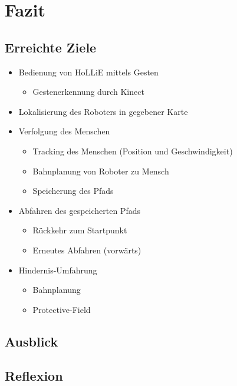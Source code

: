 
\chapter{Fazit}

\section{Erreichte Ziele}
\authorsection{\editordummy}

\begin{itemize}
  \item Bedienung von HoLLiE mittels Gesten
	\begin{itemize}
	\item Gestenerkennung durch Kinect
	\end{itemize}
  \item Lokalisierung des Roboters in gegebener Karte
  \item Verfolgung des Menschen
	\begin{itemize}
	  \item Tracking des Menschen (Position und Geschwindigkeit)
	  \item Bahnplanung von Roboter zu Mensch
	  \item Speicherung des Pfads
	\end{itemize}
  \item Abfahren des gespeicherten Pfads
	\begin{itemize}
	  \item Rückkehr zum Startpunkt
	  \item Erneutes Abfahren (vorwärts)
	\end{itemize}
  \item Hindernis-Umfahrung
	\begin{itemize}
	  \item Bahnplanung
	  \item Protective-Field
	\end{itemize}
\end{itemize}

\section{Ausblick}
\authorsection{\editordummy}

\section{Reflexion}
\authorsection{\editorandreas}

